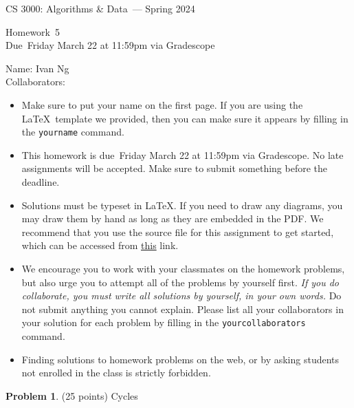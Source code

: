 \documentclass[11pt]{article}
\newcommand{\yourname}{Ivan Ng}
\newcommand{\yourcollaborators}{}
\theoremstyle{definition}
\theoremstyle{theorem}
\newtheorem{prob}{Problem}
\newcommand{\course}{CS 3000: Algorithms \& Data}
\newcommand{\semester}{Spring 2024}
\newcommand{\hwnum}{5}
\newcommand{\hwdue}{Friday March 22 at 11:59pm via Gradescope}
\begin{document}
{\Large
\begin{center} \course\ --- \semester\ \end{center}}
{\large
\vspace{10pt}
\noindent Homework~\hwnum \vspace{2pt}\\
Due~\hwdue}

\vspace{15pt}
\bigskip
{\large
\noindent Name: \yourname \vspace{2pt}\\ Collaborators: \yourcollaborators}

\vspace{15pt}
\begin{itemize}

\item
  Make sure to put your name on the first page.  If you are using the
  \LaTeX~template we provided, then you can make sure it appears by
  filling in the \texttt{yourname} command.

\item This homework is due~\hwdue.  No late assignments will be accepted.  Make sure to submit something before the deadline.

\item Solutions must be typeset in \LaTeX.  If you need to draw any diagrams,
  you may draw them by hand as long as they are embedded in the PDF.
  We recommend that you use the source file for this assignment to get started, which can be accessed from \href{https://www.overleaf.com/read/dvzgqddrmmmd#26c18b}{this} link.

\item We encourage you to work with your classmates on the homework
  problems, but also urge you to attempt all of the problems by
  yourself first. \emph{If you do collaborate, you must write all
    solutions by yourself, in your own words.}  Do not submit anything
  you cannot explain.  Please list all your collaborators in your
  solution for each problem by filling in the
  \texttt{yourcollaborators} command.

\item Finding solutions to homework problems on the web, or by asking
  students not enrolled in the class is strictly forbidden.

\end{itemize}
\newpage

\begin{prob}
	(25 points) Cycles
\end{prob}
\end{document}
